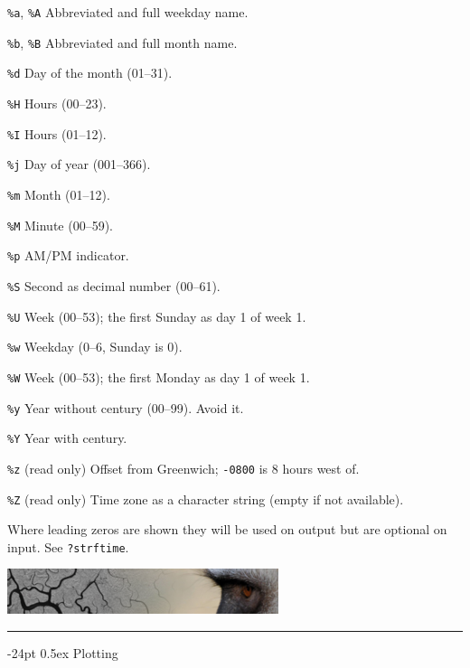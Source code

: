 \documentclass[8pt,landscape]{article}
\makeatletter
\renewcommand\section{\@startsection{section}{1}{0mm}%
                                     {-24pt}%
                                     {0.5ex}%
                                {\color{blue}\normalfont\large\bfseries}}
\newcommand{\code}{\texttt}
\newcommand{\describe}[1]{\begin{description}{#1}\end{description}}
\makeatother
\begin{document}
\begin{multicols*}{3}
  \describe{
\itemsep=0pt\parskip=0pt
    \item{\code{\%a}, \code{\%A}} {Abbreviated and full weekday name.}
    \item{\code{\%b}, \code{\%B}} {Abbreviated and full month name.}
    \item{\code{\%d}} {Day of the month (01--31).}
    \item{\code{\%H}} {Hours (00--23).}
    \item{\code{\%I}} {Hours (01--12).}
    \item{\code{\%j}} {Day of year (001--366).}
    \item{\code{\%m}} {Month (01--12).}
    \item{\code{\%M}} {Minute (00--59).}
    \item{\code{\%p}} {AM/PM indicator. }
    \item{\code{\%S}} {Second as decimal number (00--61).}
    \item{\code{\%U}} {Week (00--53); the first Sunday as day 1 of week 1.}
    \item{\code{\%w}} {Weekday (0--6, Sunday is 0).}
    \item{\code{\%W}} {Week (00--53); the first Monday as day 1 of week 1.}
    \item{\code{\%y}} {Year without century (00--99). Avoid it.}
    \item{\code{\%Y}} {Year with century.}
    \item{\code{\%z}} {(read only) Offset from Greenwich; \code{-0800} 
        is 8 hours west of.}
    \item{\code{\%Z}} {(read only) Time zone as a character string 
        (empty if not available).}
  }

Where leading zeros are shown they will be used on output but are
optional on input. See \code{?strftime}.  


\bigskip

\begin{center}
 \includegraphics[width=.3\textwidth]{pics/earth-observation_org_WegmannBevanda_velvet_monkey.png}
\end{center}



\rule{.3\textwidth}{0.4pt}


\section{Plotting}


\end{multicols*}
\end{document}
